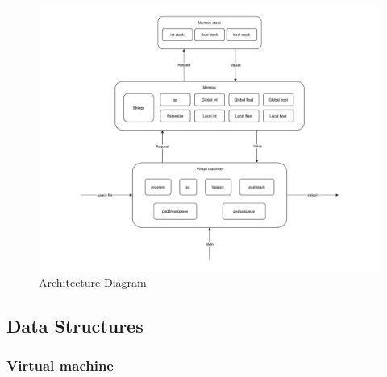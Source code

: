 \begin{figure}[h]
    \centering
    \caption{Architecture Diagram}
    \includegraphics[trim={1.80in 0 1.80in 0},width=\textwidth]{diagrams/vm_architecture}
\end{figure}

\newpage

\subsection{Data Structures}

\subsubsection{Virtual machine}

